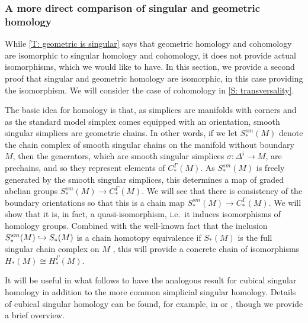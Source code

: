 \subsubsection{A more direct comparison of singular and geometric homology}\label{S: homology direct}

While \cref{T: geometric is singular} says that geometric homology and cohomology are isomorphic to singular homology and cohomology, it does not provide actual isomorphisms, which we would like to have.
In this section, we provide a second proof that singular and geometric homology are isomorphic, in this case providing the isomorphism.
We will consider the case of cohomology in \cref{S: transversality}.

The basic idea for homology is that, as simplices are manifolds with corners and as the standard model simplex comes equipped with an orientation, smooth singular simplices are geometric chains.
In other words, if we let $S^{sm}_*(M)$ denote the chain complex of smooth singular chains on the manifold without boundary $M$, then the generators, which are smooth singular simplices $\sigma \colon \Delta^i \to M$, are prechains, and so they represent elements of $C_*^\Gamma(M)$.
As $S^{sm}_*(M)$ is freely generated by the smooth singular simplices, this determines a map of graded abelian groups $S^{sm}_*(M) \to C_*^\Gamma(M)$.
We will see that there is consistency of the boundary orientations so that this is a chain map $S^{sm}_*(M) \to C_*^\Gamma(M)$.
We will show that it is, in fact, a quasi-isomorphism, i.e.\ it induces isomorphisms of homology groups.
Combined with the well-known fact that the inclusion $S^{sm}_*(M) \hookrightarrow S_*(M)$ is a chain homotopy equivalence if $S_*(M)$ is the full singular chain complex on $M$ \cite[Theorem 18.7]{Lee13}, this will provide a concrete chain of isomorphisms $H_*(M) \cong H_*^\Gamma(M)$.

It will be useful in what follows to have the analogous result for cubical singular homology in addition to the more common simplicial singular homology.
Details of cubical singular homology can be found, for example, in \cite{Mas91} or \cite[Section 8.3]{HW60}, though we provide a brief overview.

